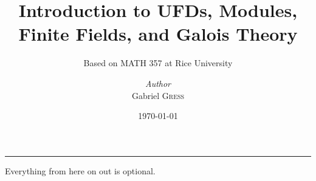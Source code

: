 \documentclass{memoir}
\institute{Rice University}
\title{Introduction to UFDs, Modules, Finite Fields, and Galois Theory}
\subtitle{Based on MATH 357 at Rice University}
\author{\textit{Author}\\ Gabriel \textsc{Gress}}
\date{\today}
\begin{document}
\maketitle

\tableofcontents

\setcounter{chapter}{-1}
































\par\noindent\rule[5pt]{\textwidth}{0.4pt}
Everything from here on out is optional.



\printindex
\end{document}
